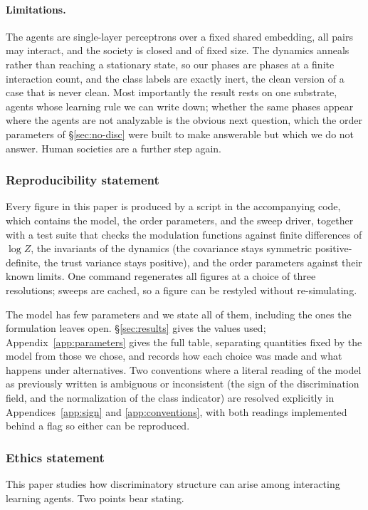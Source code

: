 \documentclass{article}
\begin{document}
\paragraph{Limitations.} The agents are single-layer perceptrons over a fixed shared
embedding, all pairs may interact, and the society is closed and of fixed size. The
dynamics anneals rather than reaching a stationary state, so our phases are phases at
a finite interaction count, and the class labels are exactly inert,
the clean version of a case that is never clean. Most importantly the result rests on one
substrate, agents whose learning rule we can write down; whether the same phases
appear where the agents are not analyzable is the obvious next question, which the
order parameters of \S\ref{sec:no-disc} were built to make answerable but which
we do not answer. Human societies are a further step again.

\subsubsection*{Reproducibility statement}
Every figure in this paper is produced by a script in the accompanying code,
which contains the model, the order parameters, and the sweep driver, together
with a test suite that checks the modulation functions against finite differences
of $\log Z$, the invariants of the dynamics (the covariance stays symmetric
positive-definite, the trust variance stays positive), and the order
parameters against their known limits. One command regenerates all figures at a
choice of three resolutions; sweeps are cached, so a figure can be restyled
without re-simulating.

The model has few parameters and we state all of them, including the ones the
formulation leaves open. \S\ref{sec:results} gives the values used;
Appendix~\ref{app:parameters} gives the full table, separating quantities fixed
by the model from those we chose, and records how each choice was made and what
happens under alternatives. Two conventions where a literal reading of the model
as previously written is ambiguous or inconsistent (the sign of the
discrimination field, and the normalization of the class indicator) are resolved explicitly in Appendices~\ref{app:sign} and \ref{app:conventions}, with
both readings implemented behind a flag so either can be reproduced.

\subsubsection*{Ethics statement}
This paper studies how discriminatory structure can arise among interacting
learning agents. Two points bear stating.
\end{document}
